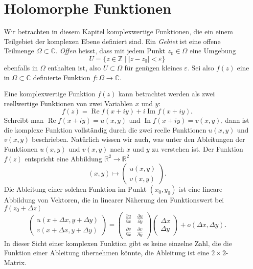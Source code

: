 %
%
%
\section{Holomorphe Funktionen
\label{buch:funktionentheorie:section:holomorph}}

Wir betrachten in diesem Kapitel komplexwertige Funktionen,
%
die ein einem Teilgebiet der komplexen Ebene definiert sind.
Ein {\em Gebiet} ist eine offene Teilmenge $\Omega\subset \mathbb C$.
%
{\em Offen} heisst, dass mit jedem Punkt $z_0\in\Omega$ eine Umgebung
%
%
\[
U=\{z\in\mathbb Z\;|\;|z-z_0|<\varepsilon\}
\]
ebenfalls in $\Omega$ enthalten ist, also $U\subset \Omega$ für genügen
kleines $\varepsilon$.
Sei also $f(z)$ eine in $\Omega\subset\mathbb C$ definierte
Funktion $f\colon\Omega\to\mathbb C$.

Eine komplexwertige Funktion $f(z)$ kann betrachtet werden als zwei
reellwertige Funktionen von zwei Variablen $x$ und $y$:
\[
f(z)=\operatorname{Re}f(x+iy) + i \operatorname{Im}f(x+iy).
\]
Schreibt man
$\operatorname{Re}f(x+iy)=u(x,y)$
und
$\operatorname{In}f(x+iy)=v(x,y)$,
dann ist die komplexe Funktion vollständig durch die zwei reelle Funktionen
$u(x,y)$ und $v(x,y)$
beschrieben.
Natürlich wissen wir auch, was unter den Ableitungen der Funktionen
$u(x,y)$ und $v(x,y)$ nach $x$ und $y$ zu verstehen ist.
Der Funktion $f(z)$ entspricht eine Abbildung $\mathbb R^2\to\mathbb R^2$
%
\[
(x,y)\mapsto\begin{pmatrix}u(x,y)\\v(x,y)\end{pmatrix}.
\]
Die Ableitung einer solchen Funktion im Punkt $(x_0,y_0)$
ist eine lineare Abbildung von Vektoren, die in linearer Näherung
den Funktionswert bei $f(z_0 + \Delta z)$
\[
\begin{pmatrix}
u(x+\Delta x, y +\Delta y)\\
v(x+\Delta x, y +\Delta y)
\end{pmatrix}
=
\begin{pmatrix}
\frac{\partial u}{\partial x}&\frac{\partial u}{\partial y}\\
\frac{\partial v}{\partial x}&\frac{\partial v}{\partial y}
\end{pmatrix}
\begin{pmatrix} \Delta x\\\Delta y \end{pmatrix}
+o(\Delta x, \Delta y).
\]
In dieser Sicht einer komplexen Funktion gibt es keine einzelne Zahl, die
die Funktion einer Ableitung übernehmen könnte, die Ableitung
ist eine $2\times 2$-Matrix.

